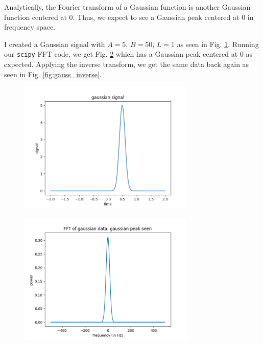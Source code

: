 \documentclass{article}
\begin{document}
Analytically, the Fourier transform of a Gaussian function is another Gaussian function centered at 0. Thus, we expect to see a Gaussian peak centered at 0 in frequency space.

I created a Gaussian signal with $A = 5$, $B = 50$, $L = 1$ as seen in Fig. \ref{fig:gauss_signal}. Running our \texttt{scipy} FFT code, we get Fig. \ref{fig:gauss_fft} which has a Gaussian peak centered at 0 as expected. Applying the inverse transform, we get the same data back again as seen in Fig. \ref{fig:gauss_inverse}.

\begin{figure}[h!]
\centering
\includegraphics[width=0.75\textwidth]{plots/gauss_signal.png}
\caption{\label{fig:gauss_signal}  }
\end{figure}

\begin{figure}[h!]
\centering
\includegraphics[width=0.75\textwidth]{plots/gauss_fft.png}
\caption{\label{fig:gauss_fft}  }
\end{figure}
\end{document}
